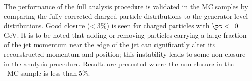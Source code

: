 The performance of the full analysis procedure is validated in the MC samples by comparing the fully corrected charged particle distributions to the generator-level distributions. Good closure (< 3\%) is seen for charged particles with $\pt < 10$ GeV.
It is to be noted that adding or removing particles carrying a large fraction of the jet momentum near the edge of the jet can significantly alter its
reconstructed momentum and position; this instability leads to some non-closure in the analysis procedure.
Results are presented where the non-closure in the \pp\ MC sample is less than 5\%.




